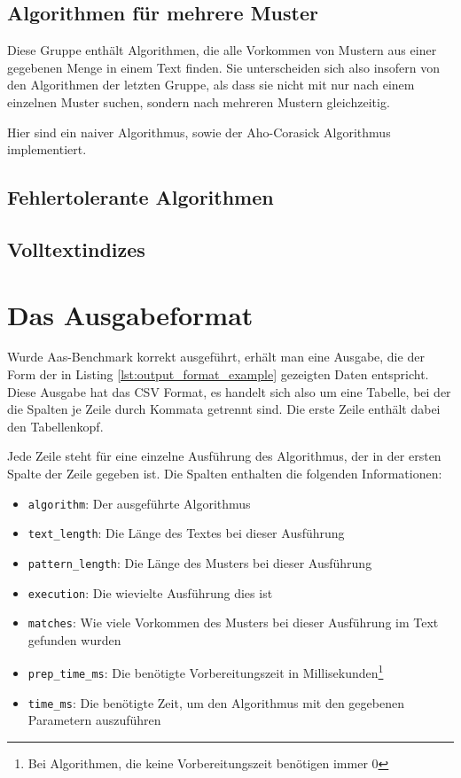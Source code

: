 \documentclass{article}
\begin{document}
\begin{multicols*}{2}
    \subsection{Algorithmen für mehrere Muster}

    Diese Gruppe enthält Algorithmen, die alle Vorkommen von Mustern aus einer gegebenen Menge in einem Text finden. Sie unterscheiden sich also insofern von den Algorithmen der letzten Gruppe, als dass sie nicht mit nur nach einem einzelnen Muster suchen, sondern nach mehreren Mustern gleichzeitig.

    Hier sind ein naiver Algorithmus, sowie der Aho-Corasick Algorithmus implementiert.

    \subsection{Fehlertolerante Algorithmen}

    \subsection{Volltextindizes}

    \section{Das Ausgabeformat}

    Wurde Aas-Benchmark korrekt ausgeführt, erhält man eine Ausgabe, die der Form der in Listing \ref{lst:output_format_example} gezeigten Daten entspricht. Diese Ausgabe hat das CSV Format, es handelt sich also um eine Tabelle, bei der die Spalten je Zeile durch Kommata getrennt sind. Die erste Zeile enthält dabei den Tabellenkopf.

    Jede Zeile steht für eine einzelne Ausführung des Algorithmus, der in der ersten Spalte der Zeile gegeben ist. Die Spalten enthalten die folgenden Informationen:

    \begin{itemize}
        \setlength{\parskip}{0em}
        \item \texttt{algorithm}: Der ausgeführte Algorithmus
        \item \texttt{text\_length}: Die Länge des Textes bei dieser Ausführung
        \item \texttt{pattern\_length}: Die Länge des Musters bei dieser Ausführung
        \item \texttt{execution}: Die wievielte Ausführung dies ist
        \item \texttt{matches}: Wie viele Vorkommen des Musters bei dieser Ausführung im Text gefunden wurden
        \item \texttt{prep\_time\_ms}: Die benötigte Vorbereitungszeit in Millisekunden\footnote{Bei Algorithmen, die keine Vorbereitungszeit benötigen immer 0}
        \item \texttt{time\_ms}: Die benötigte Zeit, um den Algorithmus mit den gegebenen Parametern auszuführen
    \end{itemize}


\end{multicols*}
\end{document}
